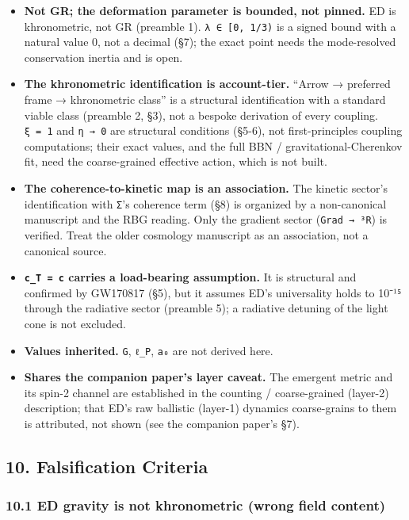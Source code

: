 \documentclass[
]{article}
\begin{document}
\begin{itemize}
\item
  \textbf{Not GR; the deformation parameter is bounded, not pinned.} ED
  is khronometric, not GR (preamble 1). \texttt{λ\ ∈\ {[}0,\ 1/3)} is a
  signed bound with a natural value 0, not a decimal (§7); the exact
  point needs the mode-resolved conservation inertia and is open.
\item
  \textbf{The khronometric identification is account-tier.} ``Arrow →
  preferred frame → khronometric class'' is a structural identification
  with a standard viable class (preamble 2, §3), not a bespoke
  derivation of every coupling. \texttt{ξ\ =\ 1} and \texttt{η\ →\ 0}
  are structural conditions (§5-6), not first-principles coupling
  computations; their exact values, and the full BBN /
  gravitational-Cherenkov fit, need the coarse-grained effective action,
  which is not built.
\item
  \textbf{The coherence-to-kinetic map is an association.} The kinetic
  sector's identification with \texttt{Σ}'s coherence term (§8) is
  organized by a non-canonical manuscript and the RBG reading. Only the
  gradient sector (\texttt{Grad\ →\ ³R}) is verified. Treat the older
  cosmology manuscript as an association, not a canonical source.
\item
  \textbf{\texttt{c\_T\ =\ c} carries a load-bearing assumption.} It is
  structural and confirmed by GW170817 (§5), but it assumes ED's
  universality holds to 10⁻¹⁵ through the radiative sector (preamble 5);
  a radiative detuning of the light cone is not excluded.
\item
  \textbf{Values inherited.} \texttt{G}, \texttt{ℓ\_P}, \texttt{a₀} are
  not derived here.
\item
  \textbf{Shares the companion paper's layer caveat.} The emergent
  metric and its spin-2 channel are established in the counting /
  coarse-grained (layer-2) description; that ED's raw ballistic
  (layer-1) dynamics coarse-grains to them is attributed, not shown (see
  the companion paper's §7).
\end{itemize}

\subsection{10. Falsification Criteria}\label{falsification-criteria}

\subsubsection{10.1 ED gravity is not khronometric (wrong field
content)}\label{ed-gravity-is-not-khronometric-wrong-field-content}
\end{document}

